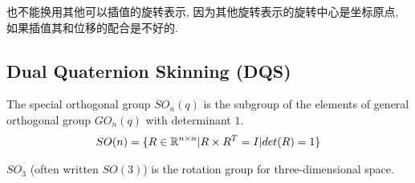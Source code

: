 也不能换用其他可以插值的旋转表示, 因为其他旋转表示的旋转中心是坐标原点, 如果插值其和位移的配合是不好的.


\subsection{Dual Quaternion Skinning (DQS)}






\begin{definition}
    The special orthogonal group $SO_n(q)$ is the subgroup of the elements of general orthogonal group $GO_n(q)$ with determinant $1$. 
    \begin{align*}
        SO(n)=\{ R\in \mathbb{R}^{n\times n} | R\times R^T = I | det (R)=1 \}
    \end{align*}

    $SO_3$ (often written $SO(3)$) is the rotation group for three-dimensional space.
\end{definition}

